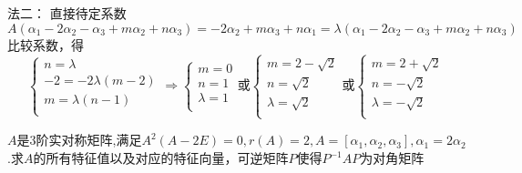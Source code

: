 \documentclass[lang=cn,10pt]{elegantbook}
\begin{document}
\begin{solution}
法二：
	直接待定系数
	\begin{equation*}
		A\left( \alpha _1-2\alpha _2-\alpha _3+m\alpha _2+n\alpha _3 \right)  =-2\alpha _2+m\alpha _3+n\alpha _1=\lambda\left( \alpha _1-2\alpha _2-\alpha _3+m\alpha _2+n\alpha _3 \right)
	\end{equation*}
	比较系数，得
	\begin{equation*}
		\begin{cases}
			n=\lambda\\
			-2=-2\lambda \left( m-2 \right)\\
			m=\lambda \left( n-1 \right)\\
		\end{cases}\Longrightarrow \begin{cases}
			m=0\\
			n=1\\
			\lambda =1\\
		\end{cases}\text{或}\begin{cases}
			m=2-\sqrt{2}\\
			n=\sqrt{2}\\
			\lambda =\sqrt{2}\\
		\end{cases}\text{或}\begin{cases}
			m=2+\sqrt{2}\\
			n=-\sqrt{2}\\
			\lambda =-\sqrt{2}\\
		\end{cases}
	\end{equation*}
\end{solution}
\begin{example}
	$A$是3阶实对称矩阵,满足$A^{2}(A-2E)=0,r(A)=2,A=[\alpha_{1},\alpha_{2},\alpha_{3}],\alpha_{1}=2\alpha_{2}$.求$A$的所有特征值以及对应的特征向量，可逆矩阵$P$使得$P^{-1}AP$为对角矩阵
\end{example}
\end{document}
